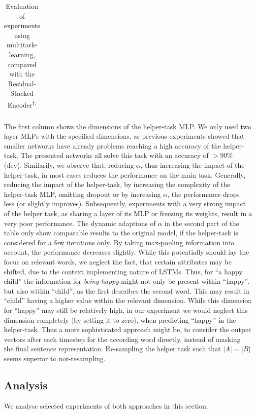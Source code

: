 \begin{table}[tph!]
{\begin{tabular}{rccc|cr|cr}
\end{tabular}}
\caption{Evaluation of experiments using multitask-learning, compared with the Residual-Stacked Encoder\textsuperscript{$\dagger$.}}
\label{tab:mt_evaluation}
\end{table}
The first column shows the dimensions of the helper-task \ac{MLP}. We only used two layer \ac{MLP}s with the specified dimensions, as previous experiments showed that smaller networks have already problems reaching a high accuracy of the helper-task. The presented networks all solve this task with an accuracy of $> 90 \%$ (dev). Similarily, we observe that, reducing  $\alpha$, thus increasing the impact of the helper-task, in most cases reduces the performance on the main task. Generally, reducing the impact of the helper-task, by increasing the complexity of the helper-task \ac{MLP}, omitting dropout or by increasing $\alpha$, the performance drops less (or slightly improves). Subsequently, experiments with a very strong impact of the helper task, as sharing a layer of its \ac{MLP} or freezing its weights, result in a very poor performance. The dynamic adaptions of $\alpha$ in the second part of the table only show comparable results to the original model, if the helper-task is considered for a few iterations only. By taking max-pooling information into account, the performance decreases slightly. While this potentially should lay the focus on relevant words, we neglect the fact, that certain attributes may be shifted, due to the context implementing nature of \ac{LSTM}s. Thus, for ``a happy child'' the information for \textit{being happy} might not only be present within ``happy'', but also within ``child'', as the first describes the second word. This may result in ``child'' having a higher value within the relevant dimension. While this dimension for ``happy'' may still be relatively high, in our experiment we would neglect this dimension completely (by setting it to zero), when predicting ``happy'' in the helper-task. Thus a more sophisticated approach might be, to consider the output vectors after each timestep for the according word directly, instead of masking the final sentence representation. Re-sampling the helper task such that $|A| = |B|$ seems superior to not-resampling.

\subsection{Analysis}
We analyse selected experiments of both approaches in this section.

